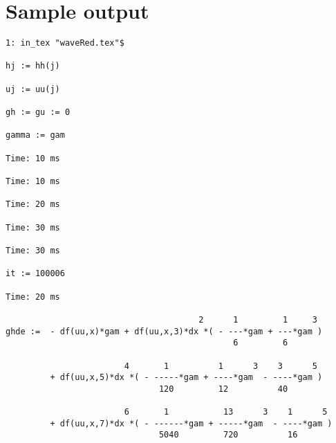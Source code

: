 \documentclass[10pt,a5paper]{article}
\begin{document}
\section{Sample output}
\begin{verbatim}
1: in_tex "waveRed.tex"$

hj := hh(j)

uj := uu(j)

gh := gu := 0

gamma := gam

Time: 10 ms

Time: 10 ms

Time: 20 ms

Time: 30 ms

Time: 30 ms

it := 100006

Time: 20 ms

                                       2      1         1     3
ghde :=  - df(uu,x)*gam + df(uu,x,3)*dx *( - ---*gam + ---*gam )
                                              6         6

                        4       1          1      3    3      5
         + df(uu,x,5)*dx *( - -----*gam + ----*gam  - ----*gam )
                               120         12          40

                        6       1           13      3    1      5
         + df(uu,x,7)*dx *( - ------*gam + -----*gam  - ----*gam )
                               5040         720          16

\end{verbatim}
\end{document}
